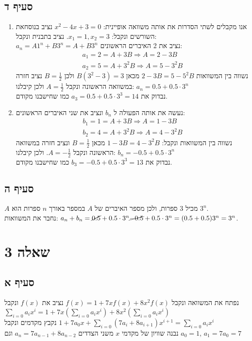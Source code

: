 \documentclass{article}
\begin{document}
	\subsection*{סעיף ד}
	\begin{enumerate}
		\item 	אנו מקבלים לשתי הסדרות את אותה משוואה אופיינית: $x^2 - 4x + 3 = 0$ נציב בנוסחאת השורשים ונקבל: $x_1 = 1, x_2 = 3$.
		נציב בתבנית ונקבל: \\
		$a_n = A1^n + B3^n = A + B3^n$ נציב את 2 האיברים הראשונים:
		\begin{align}
			a_1 = 2 = A + 3B \Rightarrow A = 2 - 3B \\
			a_2 = 5 = A + 3^2B \Rightarrow A = 5 - 3^2B
		\end{align}
		נשווה בין המשוואות $2 - 3B = 5 - 5^2B$ מכאן $B(3^2 - 3) = 3$ ולכן $B = \frac{1}{2}$ נציב חזרה במשוואה הראשונה ונקבל $A = \frac{1}{2}$
		ולכן קיבלנו: $\boxed{a_n = 0.5 + 0.5 \cdot 3^n}$ \\
		נבדוק את $a_3 = 0.5 + 0.5 \cdot 3^3 = 14$ כמו שחישבנו מקודם.
		\item
		נעשה את אותה הפעולה ל $b_n$ ונציב את שני האיברים הראשונים:
		\begin{align}
			b_1 = 1 = A + 3B \Rightarrow A = 1 - 3B \\
			b_2 = 4 = A + 3^2B \Rightarrow A = 4 - 3^2B
		\end{align}
		נשווה בין המשוואות ונקבל: $1 - 3B = 4 - 3^2B$ מכאן $B = \frac{1}{2}$ ונציב חזרה במשוואה הראשונה ונקבל $A = - \frac{1}{2}$.
		ולכן קיבלנו: $\boxed{b_n = -0.5 + 0.5 \cdot 3^n}$ \\
		נבדוק את $b_3 = -0.5 + 0.5 \cdot 3^3 = 13$ כמו שחישבנו מקודם.
	\end{enumerate}

	\subsection*{סעיף ה}
	$A$ מכיל 3 ספרות, ולכן מספר האיברים של $A$ במספר באורך $n$ ספרות הוא $3^n$. \\
	נחבר את המשוואות: $a_n + b_n = \cancel{0.5} + 0.5 \cdot 3^n \cancel{-0.5} + 0.5 \cdot 3^n = (0.5 + 0.5)3^n = 3^n$.


	\section*{שאלה 3}
	\subsection*{סעיף א}
	נפתח את המשוואה ונקבל $f(x) = 1 + 7xf(x) + 8x^2f(x)$ נציב את $f(x)$ ונקבל \\
	$\sum_{i=0}a_ix^i = 1 + 7x(\sum_{i=0}a_ix^i) + 8x^2(\sum_{i=0}a_ix^i)$ \\
	נקבץ מקדמים ונקבל $1 + 7a_0x + \sum_{i=0}(7a_i + 8a_{i+1})x^{i+1} = \sum_{i=0}a_ix^i$ \\
	נבנה שוויון של מקדמי $x$ משני הצדדים $a_n = 7a_{n-1} + 8a_{n-2}$ וגם $a_0 = 1$, $a_1 = 7a_0 = 7$
\end{document}
